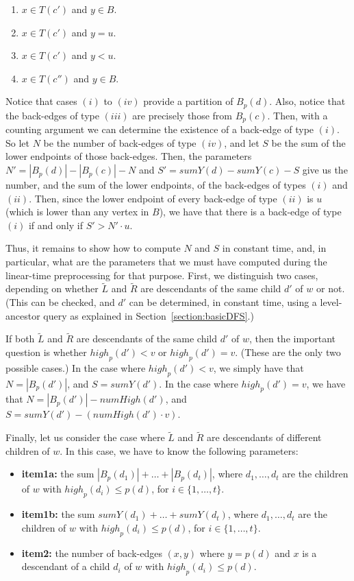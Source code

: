 \documentclass[11pt,a4paper]{article}
\begin{document}
\begin{enumerate}[label={(\roman*)}]
\item{$x\in T(c')$ and $y\in B$.}
\item{$x\in T(c')$ and $y=u$.}
\item{$x\in T(c')$ and $y<u$.}
\item{$x\in T(c'')$ and $y\in B$.}
\end{enumerate}

Notice that cases $(i)$ to $(iv)$ provide a partition of $B_p(d)$. Also, notice that the back-edges of type $(iii)$ are precisely those from $B_p(c)$. Then, with a counting argument we can determine the existence of a back-edge of type $(i)$. So let $N$ be the number of back-edges of type $(iv)$, and let $S$ be the sum of the lower endpoints of those back-edges. Then, the parameters $N'=|B_p(d)|-|B_p(c)|-N$ and $S'=\mathit{sumY}(d)-\mathit{sumY}(c)-S$ give us the number, and the sum of the lower endpoints, of the back-edges of types $(i)$ and $(ii)$. Then, since the lower endpoint of every back-edge of type $(ii)$ is $u$ (which is lower than any vertex in $B$), we have that there is a back-edge of type $(i)$ if and only if $S'>N'\cdot u$. 

Thus, it remains to show how to compute $N$ and $S$ in constant time, and, in particular, what are the parameters that we must have computed during the linear-time preprocessing for that purpose. First, we distinguish two cases, depending on whether $\widetilde{L}$ and $\widetilde{R}$ are descendants of the same child $d'$ of $w$ or not. (This can be checked, and $d'$ can be determined, in constant time, using a level-ancestor query as explained in Section~\ref{section:basicDFS}.) 

If both $\widetilde{L}$ and $\widetilde{R}$ are descendants of the same child $d'$ of $w$, then the important question is whether $\mathit{high}_p(d')<v$ or $\mathit{high}_p(d')=v$. (These are the only two possible cases.) In the case where $\mathit{high}_p(d')<v$, we simply have that $N=|B_p(d')|$, and $S=\mathit{sumY}(d')$. In the case where $\mathit{high}_p(d')=v$, we have that $N=|B_p(d')|-\mathit{numHigh}(d')$, and $S=\mathit{sumY}(d')-(\mathit{numHigh}(d')\cdot v)$. 

Finally, let us consider the case where $\widetilde{L}$ and $\widetilde{R}$ are descendants of different children of $w$. In this case, we have to know the following parameters:

\begin{itemize}
\item[]{\textbf{item1a:} the sum $|B_p(d_1)|+\dots+|B_p(d_t)|$, where $d_1,\dots,d_t$ are the children of $w$ with $\mathit{high}_p(d_i)\leq p(d)$, for $i\in\{1,\dots,t\}$.}
\item[]{\textbf{item1b:} the sum $\mathit{sumY}(d_1)+\dots+\mathit{sumY}(d_t)$, where $d_1,\dots,d_t$ are the children of $w$ with $\mathit{high}_p(d_i)\leq p(d)$, for $i\in\{1,\dots,t\}$.}
\item[]{\textbf{item2:} the number of back-edges $(x,y)$ where $y=p(d)$ and $x$ is a descendant of a child $d_i$ of $w$ with $\mathit{high}_p(d_i)\leq p(d)$.}
\end{itemize}
\end{document}
